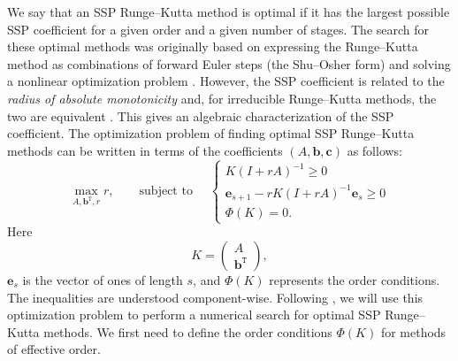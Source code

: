 We say that an SSP Runge--Kutta method is optimal if it has the largest possible SSP coefficient for a given order and a given number of stages.
The search for these optimal methods was originally based on expressing the Runge--Kutta method as combinations of forward Euler steps (the Shu--Osher form) and solving a nonlinear optimization problem \cite{Gottlieb1998, Gottlieb2001, Spiteri2003a, Spiteri2003b, Ruuth2004}.
However, the SSP coefficient is related to the \emph{radius of absolute monotonicity} \cite{Kraaijevanger1991} and, for irreducible Runge--Kutta methods, the two are equivalent \cite{Ferracina2004, Higueras2004}.
This gives an algebraic characterization of the SSP coefficient.
The optimization problem of finding optimal SSP Runge--Kutta methods
can be written in terms of the coefficients $(A,\bm{b},\bm{c})$ as
follows:
\begin{equation}\label{eqSSPopt}
    \max_{A, \bm{b}^{\texttt{T}}, r} r, \qquad \text{subject to } \quad \left\{
                                                 \begin{array}{ll}
                                                   K(I + rA)^{-1} \geq 0 \\
                                                   \bm{e}_{s+1} - rK(I + rA)^{-1}\bm{e}_{s} \geq 0 \\
                                                   \Phi(K) = 0.
                                                 \end{array}
                                               \right.
\end{equation}
Here
\begin{equation*}%
    K = \left(
            \begin{array}{c}
                     A              \\
                     \bm{b}^{\texttt{T}}
            \end{array}
         \right),
\end{equation*}
\( \bm{e}_s \) is the vector of ones of length $s$,
and \( \Phi(K) \) represents the  order conditions.
The inequalities are understood component-wise.
Following \cite{Ketcheson2008, Ketcheson2009}, we will use this optimization problem to perform a numerical search for optimal SSP Runge--Kutta methods.
We first need to define the order conditions $\Phi(K)$ for methods of effective order.

